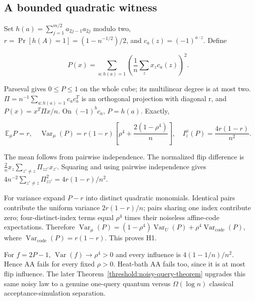 \subsection{A bounded quadratic
witness}\label{proof:higher_order_obstructions:a-bounded-quadratic-witness}

Set \(h(a)=\sum_{j=1}^{m/2}a_{2j-1}a_{2j}\) modulo two,
\(r = \Pr [h(A)=1] = (1-n^{-1/2})/2\), and \(c_a(z) = (-1)^{a\cdot z}\).
Define

\[
P(x)=\sum_{a:h(a)=1}\left(\frac1n\sum_z x_zc_a(z)\right)^2.
\]

Parseval gives \(0 \le  P \le  1\) on the whole cube; its multilinear
degree is at most two. \(\Pi  = n^{-1}\sum_{a:h(a)=1}c_a c_a^{T}\) is an
orthogonal projection with diagonal r, and \(P(x) = x^{T}\Pi x/n\). On
\((-1)^{b}c_a\), \(P = h(a)\). Exactly,

\[
\mathbb{E}_\mu P=r,\quad
\operatorname{Var}_\mu(P)=r(1-r)\left[\rho^4+\frac{2(1-\rho^4)}n\right],\quad
I_z^\mu(P)=\frac{4r(1-r)}{n^2}. \tag{H1}
\]

The mean follows from pairwise independence. The normalized flip
difference is
\(\frac{2}{n}x_z\sum_{z'\ne z}\Pi_{zz'}x_{z'}\). Squaring
and using pairwise independence gives
\(4n^{-2}\sum_{z'\ne z}\Pi_{zz'}^{2}=4r(1-r)/n^2\).

For variance expand \(P-r\) into distinct quadratic monomials. Identical
pairs contribute the uniform variance \(2r(1-r)/n\); pairs sharing one
index contribute zero; four-distinct-index terms equal \(\rho ^{4}\)
times their noiseless affine-code expectations. Therefore
\(\operatorname{Var}_\mu (P) = (1-\rho ^{4})\operatorname{Var}_U(P)+\rho ^{4}\operatorname{Var}_{\mathrm{code}}(P)\),
where \(\operatorname{Var}_{\mathrm{code}}(P) = r(1-r)\). This proves
H1.

For \(f = 2P-1\), \(\operatorname{Var}(f) \to  \rho ^{4} > 0\) and every
influence is \(4(1-1/n)/n^{2}\). Hence AA fails for every fixed
\(\rho  > 0\). Heat-bath AA fails too, since it is at most flip
influence. The later Theorem~\ref{threshold:noisy-query-theorem} upgrades
this same noisy law to a genuine one-query quantum versus
$\Omega(\log n)$ classical acceptance-simulation separation.
